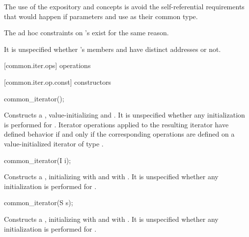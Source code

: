 \begin{addedblock}
\pnum
\enternote The use of the expository  and
 concepts is  avoid the self-referential requirements that
would happen if parameters  and  use 
as their common type.\exitnote

\pnum
\enternote The ad hoc constraints on 's 
exist for the same reason.\exitnote

\pnum
\enternote It is unspecified whether 's members
 and  have distinct addresses or not.\exitnote

[common.iter.ops]{ operations}

[common.iter.op.const]{ constructors}

%
\begin{itemdecl}
common_iterator();
\end{itemdecl}

\begin{itemdescr}
\pnum
\effects Constructs a , value-initializing 
and . It is unspecified whether any initialization is performed for
. Iterator operations applied to the resulting iterator have defined
behavior if and only if the corresponding operations are defined on a
value-initialized iterator of type .
\end{itemdescr}

%
\begin{itemdecl}
common_iterator(I i);
\end{itemdecl}

\begin{itemdescr}
\pnum
\effects Constructs a , initializing
 with  and  with . It is
unspecified whether any initialization is performed for .
\end{itemdescr}

%
\begin{itemdecl}
common_iterator(S s);
\end{itemdecl}

\begin{itemdescr}
\pnum
\effects Constructs a , initializing
 with  and  with . It is
unspecified whether any initialization is performed for .
\end{itemdescr}


\end{addedblock}
